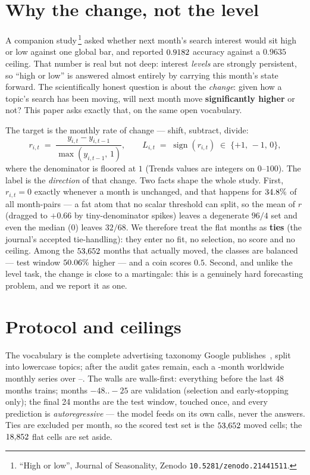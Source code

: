 \documentclass[11pt]{artaquest}
\begin{document}
\section{Why the change, not the level}

A companion study\,\footnote{``High or low'', Journal of Seasonality, Zenodo
\texttt{10.5281/zenodo.21441511}.} asked whether next month's search interest would sit high or low
against one global bar, and reported $0.9182$ accuracy against a $0.9635$ ceiling. That number is
real but not deep: interest \emph{levels} are strongly persistent, so ``high or low'' is answered
almost entirely by carrying this month's state forward. The scientifically honest question is about
the \emph{change}: given how a topic's search has been moving, will next month move
\textbf{significantly higher} or not? This paper asks exactly that, on the same open vocabulary.

The target is the monthly rate of change --- shift, subtract, divide:
\begin{equation}
r_{i,t} \;=\; \frac{y_{i,t}-y_{i,t-1}}{\max(y_{i,t-1},\,1)},
\qquad
L_{i,t} \;=\; \operatorname{sign}(r_{i,t}) \;\in\; \{+1,\,-1,\,0\},
\label{eq:label}
\end{equation}
where the denominator is floored at $1$ (Trends values are integers on $0$--$100$). The label is the
\emph{direction} of that change. Two facts shape the whole study. First, $r_{i,t}=0$ exactly whenever a
month is unchanged, and that happens for $34.8\%$ of all month-pairs --- a fat atom that no scalar
threshold can split, so the mean of $r$ (dragged to $+0.66$ by tiny-denominator spikes) leaves a
degenerate $96/4$ set and even the median ($0$) leaves $32/68$. We therefore treat the flat months as
\textbf{ties} (the journal's accepted tie-handling): they enter no fit, no selection, no score and no
ceiling. Among the $53{,}652$ months that actually moved, the classes are balanced --- test window
$50.06\%$ higher --- and a coin scores $0.5$. Second, and unlike the level task, the change is
close to a martingale: this is a genuinely hard forecasting problem, and we report it as one.

\section{Protocol and ceilings}

The vocabulary is the complete advertising taxonomy Google publishes~\cite{googleads2024verticals},
split into lowercase topics; after the audit gates \nTopics{} remain, each a \nMonths{}-month worldwide
monthly series over \winStart{}--\winEnd{}. The walls are walls-first: everything before the last 48
months trains; months $-48..-25$ are validation (selection and early-stopping only); the final 24
months are the test window, touched once, and every prediction is \emph{autoregressive} --- the model
feeds on its own calls, never the answers. Ties are excluded per month, so the scored test set is the
$53{,}652$ moved cells; the $18{,}852$ flat cells are set aside.
\end{document}
